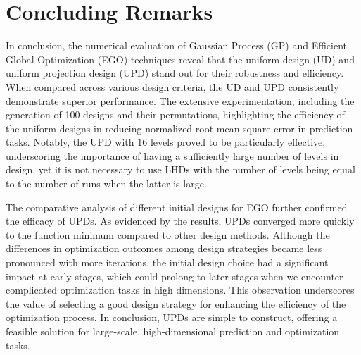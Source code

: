 \documentclass [PhD] {package/uclathes}
\begin{document}
\section{Concluding Remarks}
In conclusion, the numerical evaluation of Gaussian Process (GP) and Efficient Global Optimization (EGO) techniques reveal that the uniform design (UD) and uniform projection design (UPD)  stand out for their robustness and efficiency. When compared across various design criteria, the UD and UPD consistently demonstrate superior performance. The extensive experimentation, including the generation of 100 designs and their permutations, highlighting the efficiency of the uniform designs in reducing normalized root mean square error in prediction tasks.
Notably, the UPD with 16 levels proved to be particularly effective, underscoring the importance of having a sufficiently large number of levels in design, yet it is not necessary to use LHDs with the number of levels being equal to the number of runs when the latter is large.

The comparative analysis of different initial designs for EGO further confirmed the efficacy of UPDs. As evidenced by the results, UPDs converged more quickly to the function minimum compared to other design methods. Although the differences in optimization outcomes among design strategies became less pronounced with more iterations, the initial design choice had a significant impact at early stages, which could prolong to later stages when we encounter complicated optimization tasks in high dimensions. This observation underscores the value of selecting a good design strategy for enhancing the efficiency of the optimization process. In conclusion, UPDs are simple to construct, offering a  feasible solution for large-scale, high-dimensional prediction and optimization tasks.
\end{document}
